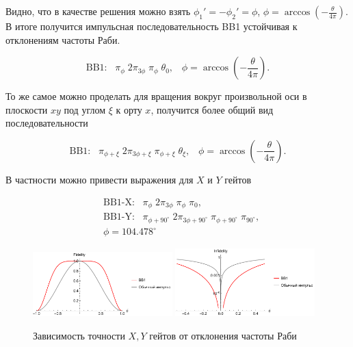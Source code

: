 Видно, что в качестве решения можно взять $\phi_1' = -\phi_2' = \phi$, $\phi = \arccos\left( -\frac{\theta}{4\pi}\right)$. В итоге получится импульсная последовательность BB1 \cite{Wimperis1994BroadbandNA, WIMPERIS199046,WIMPERIS1989509} устойчивая к отклонениям частоты Раби.

\begin{equation}
	\text{BB1:} \;\;\;  \pi_\phi \; 2\pi_{3\phi} \; \pi_\phi \; \theta_0, \;\;\; \phi = \arccos\left( -\frac{\theta}{4\pi}\right).
\end{equation}

То же самое можно проделать для вращения вокруг произвольной оси в плоскости $xy$ под углом $\xi$ к орту $x$, получится более общий вид последовательности

\begin{equation}
	\text{BB1:} \;\;\;  \pi_{\phi+\xi} \; 2\pi_{3\phi+\xi} \; \pi_{\phi+\xi} \; \theta_\xi, \;\;\; \phi = \arccos\left( -\frac{\theta}{4\pi}\right).
\end{equation}

В частности можно привести выражения для $X$ и $Y$ гейтов

\begin{equation}
	\begin{aligned}
		& \text{BB1-X:} \;\;\;  \pi_{\phi} \; 2\pi_{3\phi} \; \pi_\phi \; \pi_0,  \\
		& \text{BB1-Y:} \;\;\;  \pi_{\phi+90^{\circ}} \; 2\pi_{3\phi + 90^\circ} \; \pi_{\phi+ 90^\circ} \; \pi_{90^\circ}, \\ 
		& \phi = 104.478 ^\circ
	\end{aligned}
\end{equation}


\begin{figure}[tb]
	\centering
	\includegraphics[width=0.48\textwidth]{images/fidelity_BB1.pdf}
	\includegraphics[width=0.48\textwidth]{images/infidelity_BB1.pdf}
	\caption{Зависимость точности $X,Y$ гейтов от отклонения частоты Раби}
	\label{fig:BB1}
\end{figure}

